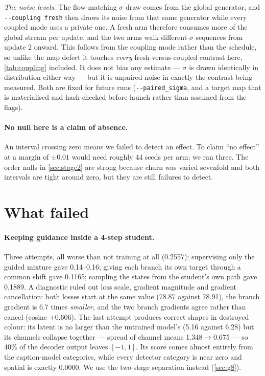 \documentclass[11pt]{article}
\newcommand{\obs}[1]{\textcolor{obsblue}{#1}}
\newcommand{\bad}[1]{\textcolor{badred}{#1}}
\begin{document}
\emph{The noise levels.} The flow-matching $\sigma$ draw comes from the global generator, and
\texttt{-{}-coupling fresh} then draws its noise from that same generator while every coupled mode
uses a private one. A fresh arm therefore consumes more of the global stream per update, and the
two arms walk different $\sigma$ sequences from update \obs{2} onward. This follows from the
coupling mode rather than the schedule, so unlike the map defect it touches \emph{every}
fresh-versus-coupled contrast here, \cref{tab:coupling} included. It does not bias any estimate ---
$\sigma$ is drawn identically in distribution either way --- but it is unpaired noise in exactly the
contrast being measured. Both are fixed for future runs (\texttt{-{}-paired\_sigma}, and a target
map that is materialised and hash-checked before launch rather than assumed from the flags).

\paragraph{No null here is a claim of absence.}
An interval crossing zero means we failed to detect an effect. To claim ``no effect'' at a margin of
\obs{$\pm0.01$} would need roughly \obs{44} seeds per arm; we ran three. The order nulls in
\cref{sec:stage2} are strong because churn was varied sevenfold and both intervals are tight around
zero, but they are still failures to detect.


\section{What failed}
\label{sec:failures}

\paragraph{Keeping guidance inside a 4-step student.}
Three attempts, all worse than not training at all (\obs{0.2557}): supervising only the guided
mixture gave \bad{0.14--0.16}; giving each branch its own target through a common shift gave
\bad{0.1165}; sampling the states from the student's own path gave \bad{0.1889}. A diagnostic ruled
out loss scale, gradient magnitude and gradient cancellation: both losses start at the same value
(\obs{78.87} against \obs{78.91}), the branch gradient is \obs{6.7} times \emph{smaller}, and the two
branch gradients agree rather than cancel (cosine \obs{$+0.606$}). The last attempt produces correct
shapes in destroyed colour: its latent is no larger than the untrained model's
(\obs{5.16} against \obs{6.28}) but its channels collapse together --- spread of channel means
\obs{1.348}$\to$\obs{0.675} --- so \obs{40\%} of the decoder output leaves $[-1,1]$. Its score comes
almost entirely from the caption-model categories, while every detector category is near zero and
spatial is exactly \obs{0.0000}. We use the two-stage separation instead (\cref{sec:g8}).
\end{document}
